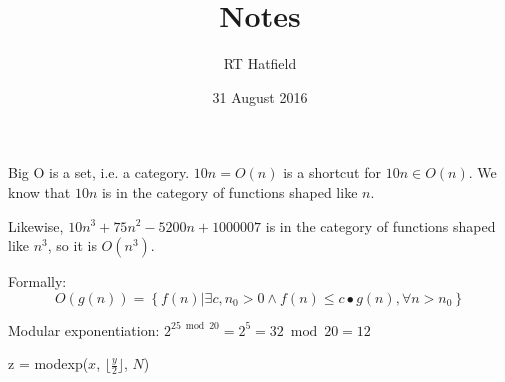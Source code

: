 \documentclass{article}
\title{Notes}
\author{RT Hatfield}
\date{31 August 2016}
\begin{document}
Big O is a set, i.e. a category.
$10n = O(n)$ is a shortcut for $10n \in O(n)$.  We know that $10n$ is in the category of functions shaped
like $n$.  

Likewise, $10n^3 + 75n^2 - 5200n + 1000007$ is in the category of functions shaped like $n^3$, so it is $O(n^3)$.

Formally:
$$ O(g(n)) = \left\{ {f(n) | \exists c,n_0 > 0 \land f(n) \leq c\bullet g(n), \forall n>n_0 }\right\}$$

Modular exponentiation:
$2^{25 \bmod 20}=2^5=32 \bmod 20=12$
\begin{algorithm}[H]
    z = modexp($x$, $\lfloor\frac{y}{2}\rfloor$, $N$)\;
\end{algorithm}
\end{document}
